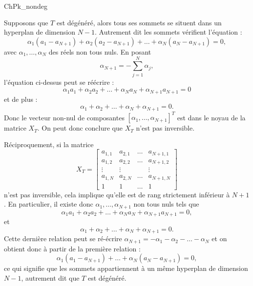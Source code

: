 \begin{corrige}{ChPk_nondeg}

Supposons que $T$ est dégénéré, alors tous ses sommets se situent dans un hyperplan de dimension $N-1$. Autrement dit les sommets vérifient l'équation :
\[
\alpha_1 ( a_1 - a_{N+1} ) + \alpha_2 ( a_2 - a_{N+1} ) + \ldots +
\alpha_N ( a_N - a_{N+1} ) = 0,
\]
avec $\alpha_1,\dots,\alpha_N$ des réels non tous nuls. En posant
\[
\alpha_{N+1} = - \sum_{j=1}^N \alpha_j,
\]
l'équation ci-dessus peut se réécrire :
\[
\alpha_1 a_1 + \alpha_2 a_2 + \ldots + \alpha_N a_N + \alpha_{N+1} a_{N+1} = 0
\]
et de plus :
\[
\alpha_1 + \alpha_2 + \ldots + \alpha_N + \alpha_{N+1} = 0.
\]
Donc le vecteur non-nul de composantes $[ \alpha_1 , \ldots , \alpha_{N+1} ]^T$ est dans le noyau de la matrice $X_T$. On peut donc conclure que $X_T$ n'est pas inversible.

\medskip

Réciproquement, si la matrice 
\[
X_T = \left [
\begin{array}{cccc}
a_{1,1} & a_{2,1} & \ldots & a_{N+1,1} \\
a_{1,2} & a_{2,2} & \ldots & a_{N+1,2} \\
\vdots & \vdots & & \vdots \\
a_{1,N} & a_{2,N} & \ldots & a_{N+1,N} \\
1 & 1 & \ldots & 1
\end{array}
\right ]
\]
n'est pas inversible, cela implique qu'elle est de rang strictement inférieur à $N+1$. En particulier, il existe donc $\alpha_1, \ldots, \alpha_{N+1}$ non tous nuls tels que 
\[
\alpha_1 a_1 + \alpha_2 a_2 + \ldots + \alpha_N a_N + \alpha_{N+1} a_{N+1} = 0,
\]
et
\[
\alpha_1 + \alpha_2 + \ldots + \alpha_N + \alpha_{N+1} = 0.
\]
Cette dernière relation peut se ré-écrire $\alpha_{N+1} = - \alpha_1 - \alpha_2 - \ldots - \alpha_N$ et on obtient donc à partir de la première relation :
\[
\alpha_1 ( a_1 - a_{N+1} )+ \ldots + \alpha_{N} ( a_{N} - a_{N+1} ) = 0,
\]
ce qui signifie que les sommets appartiennent à un même hyperplan de dimension $N-1$, autrement dit que $T$ est dégénéré.

\end{corrige}

\medskip

